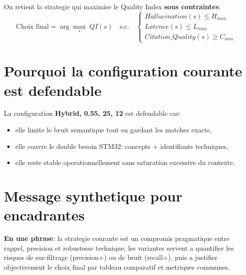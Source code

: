 \documentclass[11pt,a4paper]{article}
\begin{document}
On retient la strategie qui maximise le Quality Index \textbf{sous contraintes}:
\begin{equation}
\text{Choix final} = \arg\max_s\; QI(s)
\quad \text{s.c.} \quad
\begin{cases}
Hallucination(s) \leq H_{max}\\
Latence(s) \leq L_{max}\\
Citation\_Quality(s) \geq C_{min}
\end{cases}
\end{equation}

\section{Pourquoi la configuration courante est defendable}

La configuration \textbf{Hybrid, 0.55, 25, 12} est defendable car:
\begin{itemize}
  \item elle limite le bruit semantique tout en gardant les matches exacts,
  \item elle couvre le double besoin STM32: concepts + identifiants techniques,
  \item elle reste stable operationnellement sans saturation excessive du contexte.
\end{itemize}

\section{Message synthetique pour encadrantes}

\textbf{En une phrase}: la strategie courante est un compromis pragmatique entre rappel, precision et robustesse technique; les variantes servent a quantifier les risques de sur-filtrage (precision+) ou de bruit (recall+), puis a justifier objectivement le choix final par tableau comparatif et metriques communes.
\end{document}

